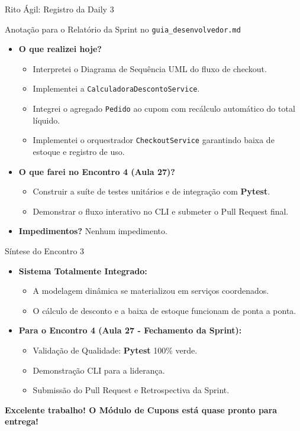 \documentclass[10pt]{beamer}
\begin{document}
\begin{frame}{Rito Ágil: Registro da Daily 3}
    \begin{block}{Anotação para o Relatório da Sprint no \texttt{guia\_desenvolvedor.md}}
    \begin{itemize}
        \item \textbf{O que realizei hoje?}
        \begin{itemize}
            \item Interpretei o Diagrama de Sequência UML do fluxo de checkout.
            \item Implementei a \texttt{CalculadoraDescontoService}.
            \item Integrei o agregado \texttt{Pedido} ao cupom com recálculo automático do total líquido.
            \item Implementei o orquestrador \texttt{CheckoutService} garantindo baixa de estoque e registro de uso.
        \end{itemize}
        \item \textbf{O que farei no Encontro 4 (Aula 27)?}
        \begin{itemize}
            \item Construir a suíte de testes unitários e de integração com \textbf{Pytest}.
            \item Demonstrar o fluxo interativo no CLI e submeter o Pull Request final.
        \end{itemize}
        \item \textbf{Impedimentos?} Nenhum impedimento.
    \end{itemize}
    \end{block}
\end{frame}

\begin{frame}{Síntese do Encontro 3}
    \begin{itemize}
        \item \textbf{Sistema Totalmente Integrado:}
        \begin{itemize}
            \item A modelagem dinâmica se materializou em serviços coordenados.
            \item O cálculo de desconto e a baixa de estoque funcionam de ponta a ponta.
        \end{itemize}
        \item \textbf{Para o Encontro 4 (Aula 27 - Fechamento da Sprint):}
        \begin{itemize}
            \item Validação de Qualidade: \textbf{Pytest} 100\% verde.
            \item Demonstração CLI para a liderança.
            \item Submissão do Pull Request e Retrospectiva da Sprint.
        \end{itemize}
    \end{itemize}
    \vspace{0.4cm}
    \centering
    \textbf{Excelente trabalho! O Módulo de Cupons está quase pronto para entrega!}
\end{frame}
\end{document}
